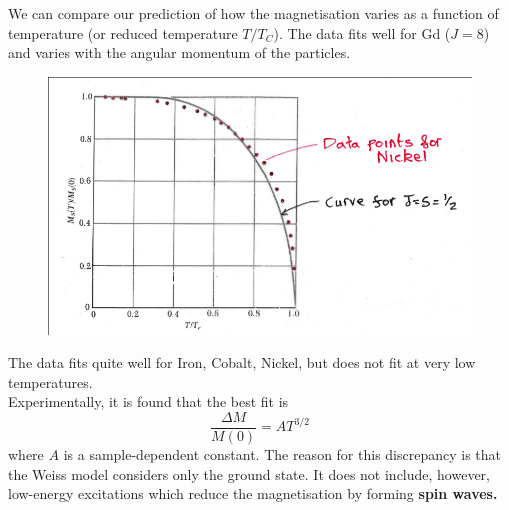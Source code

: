 \documentclass[a4paper, 11pt, normalem]{report}
\begin{document}
We can compare our prediction of how the magnetisation varies as a function of temperature (or reduced temperature $T/T_C$).
The data fits well for Gd ($J=8$) and varies with the angular momentum of the particles. 
\begin{figure}[H]
    \centering
    \includegraphics[scale=0.5]{nick.png}
\end{figure}
The data fits quite well for Iron, Cobalt, Nickel, but does not fit at very low temperatures. \\
Experimentally, it is found that the best fit is
\begin{equation}
    \frac{\Delta M}{M(0)} = AT^{3/2}
\end{equation}
where $A$ is a sample-dependent constant. 
The reason for this discrepancy is that the Weiss model considers only the ground state.
It does not include, however, low-energy excitations which reduce the magnetisation by forming \textbf{spin waves.}
\end{document}
